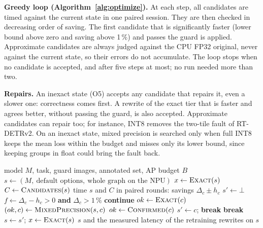 \documentclass[conference]{IEEEtran}
\begin{document}
\textbf{Greedy loop (Algorithm~\ref{alg:optimize}).} At each step, all candidates are timed against the current state in one paired session. They are then checked in decreasing order of saving. The first candidate that is significantly faster (lower bound above zero and saving above 1\,\%) and passes the guard is applied. Approximate candidates are always judged against the CPU FP32 original, never against the current state, so their errors do not accumulate. The loop stops when no candidate is accepted, and after five steps at most; no run needed more than two.

\textbf{Repairs.} An inexact state (O5) accepts any candidate that repairs it, even a slower one: correctness comes first. A rewrite of the exact tier that is faster and agrees better, without passing the guard, is also accepted. Approximate candidates can repair too; for instance, INT8 removes the two-tile fault of RT-DETRv2. On an inexact state, mixed precision is searched only when full INT8 keeps the mean loss within the budget and misses only its lower bound, since keeping groups in float could bring the fault back.

\begin{algorithm}[t]
\caption{Measured greedy optimization}
\label{alg:optimize}
\begin{algorithmic}[1]
\Require model $M$, task, guard images, annotated set, AP budget $B$
\State $s \gets (M,\ \text{default options},\ \text{whole graph on the NPU})$
\State $x \gets \textsc{Exact}(s)$ 
  \State $C \gets \textsc{Candidates}(s)$
  \State time $s$ and $C$ in paired rounds: savings $\Delta_c \pm h_c$
  \State $s' \gets \bot$
    \State $f \gets \Delta_c - h_c > 0$ \textbf{and} $\Delta_c > 1\,\%$ 
      \State \textbf{continue} 
    \EndIf
    \State $ok \gets \textsc{Exact}(c)$
      \State $(ok, c) \gets \textsc{MixedPrecision}(s, c)$ 
    \EndIf
      \State $ok \gets \textsc{Confirmed}(c)$ 
    \EndIf
      \State $s' \gets c$; \textbf{break}
    \EndIf
  \EndFor
    \State \textbf{break}
  \EndIf
  \State $s \gets s'$; $x \gets \textsc{Exact}(s)$
\EndFor
\State \Return $s$ and the measured latency of the retraining rewrites on $s$
\end{algorithmic}
\end{algorithm}
\end{document}
